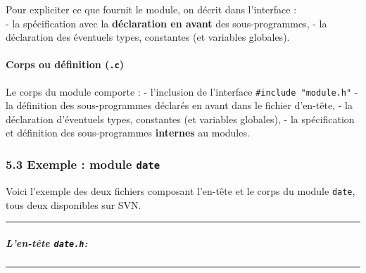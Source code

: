 \documentclass[11pt]{article}
\begin{document}
Pour expliciter ce que fournit le module, on décrit dans l'interface :\\
- la spécification avec la \textbf{déclaration en avant} des
sous-programmes, - la déclaration des éventuels types, constantes (et
variables globales).

\paragraph{\texorpdfstring{Corps ou définition
(\texttt{.c})}{Corps ou définition (.c)}}\label{corps-ou-duxe9finition-.c}

Le corps du module comporte : - l'inclusion de l'interface
\texttt{\#include\ "module.h"} - la définition des sous-programmes
déclarés en avant dans le fichier d'en-tête, - la déclaration
d'éventuels types, constantes (et variables globales), - la
spécification et définition des sous-programmes \textbf{internes} au
modules.

    \subsubsection{\texorpdfstring{5.3 Exemple : module
\texttt{date}}{5.3 Exemple : module date}}\label{exemple-module-date}

Voici l'exemple des deux fichiers composant l'en-tête et le corps du
module \texttt{date}, tous deux disponibles sur SVN.

    \begin{center}\rule{0.5\linewidth}{\linethickness}\end{center}

\subparagraph{\texorpdfstring{L'en-tête
\texttt{date.h}:}{L'en-tête date.h:}}\label{len-tuxeate-date.h}

\begin{center}\rule{0.5\linewidth}{\linethickness}\end{center}
\end{document}
